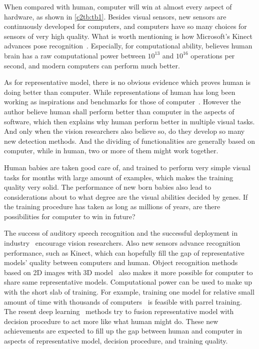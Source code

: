 When compared with human, computer will win at almost every aspect of hardware, as shown in \ref{c2tb:tb1}. Besides visual sensors, new sensors are continuously developed for computers, and computers have so many choices for sensors of very high quality. What is worth mentioning is how Microsoft's Kinect advances pose recognition~\cite{knct}. Especially, for computational ability, \cite{bpw} believes human brain has a raw computational power between $10^{13}$ and $10^{16}$ operations per second, and modern computers can perform much better.

 As for representative model, there is no obvious evidence which proves human is doing better than computer. While representations of human has long been working as inspirations and benchmarks for those of computer~\cite{rbm}. However the author believe human shall perform better than computer in the aspects of software, which then explains why human perform better in multiple visual tasks. And only when the vision researchers also believe so, do they develop  so many new detection methods. And the  dividing of functionalities  are generally based on computer, while in human, two or more of them might work together.

Human babies are taken good care of, and trained to perform very simple visual tasks for months with large amount of examples, which makes the training quality very solid. The performance of new born babies also lead to considerations about to what degree are the visual abilities decided by genes. If the training procedure has taken as long as millions of years, are there possibilities for computer to win in future?

The success of auditory speech recognition and the successful deployment in industry~\cite{siri} encourage vision researchers. Also new sensors advance recognition performance, such as Kinect, which can hopefully fill the gap of representative models' quality between computers and human. Object recognition methods based on 2D images with 3D model~\cite{r3d} also makes it more possible for computer to share same representative models.  Computational power can be used to make up with the short slab of training. For example, training one model for relative small amount of time with thousands of computers~\cite{dnnnn} is feasible with parrel training. The resent deep learning~\cite{dlearn} methods try to fusion representative model with decision procedure to act more like what human might do. These new achievements are expected to fill up the gap between human and computer in aspects of representative model, decision procedure, and training quality.



